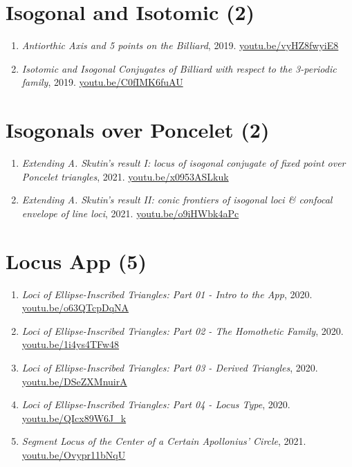 \documentclass[12pt]{article}
\begin{document}
\section{Isogonal and Isotomic (2)}

\begin{enumerate}[resume]
\item \textit{Antiorthic Axis and 5 points on the Billiard}, 2019. \href{https://youtu.be/vyHZ8fwyiE8}{\url{youtu.be/vyHZ8fwyiE8}}
\item \textit{Isotomic and Isogonal Conjugates of Billiard with respect to the 3-periodic family}, 2019. \href{https://youtu.be/C0fIMK6fuAU}{\url{youtu.be/C0fIMK6fuAU}}
\end{enumerate}

\section{Isogonals over Poncelet (2)}

\begin{enumerate}[resume]
\item \textit{Extending A. Skutin's result I: locus of isogonal conjugate of fixed point over Poncelet triangles}, 2021. \href{https://youtu.be/x0953ASLkuk}{\url{youtu.be/x0953ASLkuk}}
\item \textit{Extending A. Skutin's result II: conic frontiers of isogonal loci \& confocal envelope of line loci}, 2021. \href{https://youtu.be/o9iHWbk4aPc}{\url{youtu.be/o9iHWbk4aPc}}
\end{enumerate}

\section{Locus App (5)}

\begin{enumerate}[resume]
\item \textit{Loci of Ellipse-Inscribed Triangles: Part 01 - Intro to the App}, 2020. \href{https://youtu.be/o63QTcpDqNA}{\url{youtu.be/o63QTcpDqNA}}
\item \textit{Loci of Ellipse-Inscribed Triangles: Part 02 - The Homothetic Family}, 2020. \href{https://youtu.be/1i4ys4TFw48}{\url{youtu.be/1i4ys4TFw48}}
\item \textit{Loci of Ellipse-Inscribed Triangles: Part 03 - Derived Triangles}, 2020. \href{https://youtu.be/DSeZXMnuirA}{\url{youtu.be/DSeZXMnuirA}}
\item \textit{Loci of Ellipse-Inscribed Triangles: Part 04 - Locus Type}, 2020. \href{https://youtu.be/QIcx89W6J_k}{\url{youtu.be/QIcx89W6J\_k}}
\item \textit{Segment Locus of the Center of a Certain Apollonius' Circle}, 2021. \href{https://youtu.be/Ovypr11bNqU}{\url{youtu.be/Ovypr11bNqU}}
\end{enumerate}
\end{document}

